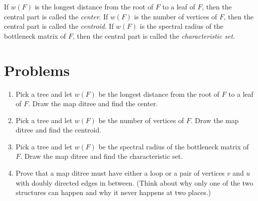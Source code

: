 \documentclass{article}
\theoremstyle{definition}
\begin{document}
If $w(F)$ is the longest distance from the root of $F$ to a leaf of $F$, then the central part is called the \emph{center}.  If $w(F)$ is the number of vertices of $F$, then the central part is called the \emph{centroid}.  If $w(F)$ is the spectral radius of the bottleneck matrix of $F$, then the central part is called the \emph{characteristic set}.

\section*{Problems}
\begin{enumerate}
\setlength\itemsep{2em}
\item Pick a tree and let $w(F)$ be the longest distance from the root of $F$ to a leaf of $F$.  Draw the map ditree and find the center.
\item Pick a tree and let $w(F)$ be the number of vertices of $F$.  Draw the map ditree and find the centroid.
\item Pick a tree and let $w(F)$ be the spectral radius of the bottleneck matrix of $F$.  Draw the map ditree and find the characteristic set.
\item Prove that a map ditree must have either a loop or a pair of vertices $v$ and $u$ with doubly directed edges in between.  (Think about why only one of the two structures can happen and why it never happens at two places.)
\end{enumerate}

\end{document}

